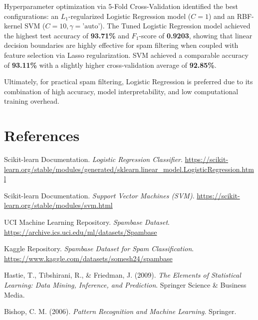 \documentclass[12pt,a4paper]{article}
\begin{document}
Hyperparameter optimization via 5-Fold Cross-Validation identified the best configurations: an $L_1$-regularized Logistic Regression model ($C=1$) and an RBF-kernel SVM ($C=10, \gamma=\text{'auto'}$). The Tuned Logistic Regression model achieved the highest test accuracy of \textbf{93.71\%} and $F_1$-score of \textbf{0.9203}, showing that linear decision boundaries are highly effective for spam filtering when coupled with feature selection via Lasso regularization. SVM achieved a comparable accuracy of \textbf{93.11\%} with a slightly higher cross-validation average of \textbf{92.85\%}. 

Ultimately, for practical spam filtering, Logistic Regression is preferred due to its combination of high accuracy, model interpretability, and low computational training overhead.

\section{References}
\begin{enumerate}[label={[\arabic*]}]
    \item Scikit-learn Documentation. \textit{Logistic Regression Classifier}. \url{https://scikit-learn.org/stable/modules/generated/sklearn.linear_model.LogisticRegression.html}
    \item Scikit-learn Documentation. \textit{Support Vector Machines (SVM)}. \url{https://scikit-learn.org/stable/modules/svm.html}
    \item UCI Machine Learning Repository. \textit{Spambase Dataset}. \url{https://archive.ics.uci.edu/ml/datasets/Spambase}
    \item Kaggle Repository. \textit{Spambase Dataset for Spam Classification}. \url{https://www.kaggle.com/datasets/somesh24/spambase}
    \item Hastie, T., Tibshirani, R., \& Friedman, J. (2009). \textit{The Elements of Statistical Learning: Data Mining, Inference, and Prediction}. Springer Science \& Business Media.
    \item Bishop, C. M. (2006). \textit{Pattern Recognition and Machine Learning}. Springer.
\end{enumerate}
\end{document}
